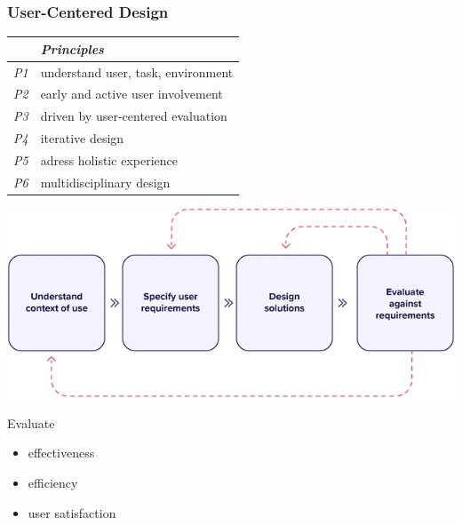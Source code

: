 \documentclass{kul-ulille-beamer}
\begin{document}
\begin{frame}[c, noframenumbering]
\frametitle{User-Centered Design}

  \begin{minipage}[c]{.5\textwidth}
  \begin{tabular}{|l|l|}
    \hline
     & \emph{Principles} \\ \hline
     \emph{P1} & understand user, task, environment \\
     \emph{P2} & early and active user involvement \\
     \emph{P3} & driven by user-centered evaluation \\
     \emph{P4} & iterative design \\
     \emph{P5} & adress holistic experience \\
     \emph{P6} & multidisciplinary design \\
    \hline
  \end{tabular}
  \end{minipage}\hfill%
  \begin{minipage}[c]{.45\textwidth}
    \includegraphics[width=\textwidth]{figures/supp/ucd.png}
    \bigskip

    Evaluate
    \begin{itemize}
      \item effectiveness
      \item efficiency
      \item user satisfaction
    \end{itemize}
  \end{minipage}

\end{frame}
\end{document}
